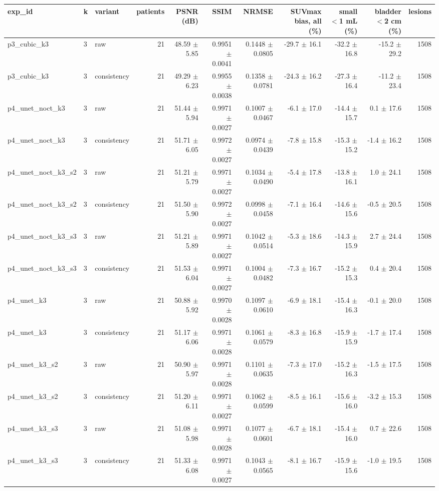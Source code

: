 \begin{tabular}{lllrrrrrrrr}
\toprule
exp\_id & k & variant & patients & PSNR (dB) & SSIM & NRMSE & SUVmax bias, all (\%) & small $<$1 mL (\%) & bladder $<$2 cm (\%) & lesions \\
\midrule
p3\_cubic\_k3 & 3 & raw & 21 & 48.59 $\pm$ 5.85 & 0.9951 $\pm$ 0.0041 & 0.1448 $\pm$ 0.0805 & -29.7 $\pm$ 16.1 & -32.2 $\pm$ 16.8 & -15.2 $\pm$ 29.2 & 1508 \\
p3\_cubic\_k3 & 3 & consistency & 21 & 49.29 $\pm$ 6.23 & 0.9955 $\pm$ 0.0038 & 0.1358 $\pm$ 0.0781 & -24.3 $\pm$ 16.2 & -27.3 $\pm$ 16.4 & -11.2 $\pm$ 23.4 & 1508 \\
p4\_unet\_noct\_k3 & 3 & raw & 21 & 51.44 $\pm$ 5.94 & 0.9971 $\pm$ 0.0027 & 0.1007 $\pm$ 0.0467 & -6.1 $\pm$ 17.0 & -14.4 $\pm$ 15.7 & 0.1 $\pm$ 17.6 & 1508 \\
p4\_unet\_noct\_k3 & 3 & consistency & 21 & 51.71 $\pm$ 6.05 & 0.9972 $\pm$ 0.0027 & 0.0974 $\pm$ 0.0439 & -7.8 $\pm$ 15.8 & -15.3 $\pm$ 15.2 & -1.4 $\pm$ 16.2 & 1508 \\
p4\_unet\_noct\_k3\_s2 & 3 & raw & 21 & 51.21 $\pm$ 5.79 & 0.9971 $\pm$ 0.0027 & 0.1034 $\pm$ 0.0490 & -5.4 $\pm$ 17.8 & -13.8 $\pm$ 16.1 & 1.0 $\pm$ 24.1 & 1508 \\
p4\_unet\_noct\_k3\_s2 & 3 & consistency & 21 & 51.50 $\pm$ 5.90 & 0.9972 $\pm$ 0.0027 & 0.0998 $\pm$ 0.0458 & -7.1 $\pm$ 16.4 & -14.6 $\pm$ 15.6 & -0.5 $\pm$ 20.5 & 1508 \\
p4\_unet\_noct\_k3\_s3 & 3 & raw & 21 & 51.21 $\pm$ 5.89 & 0.9971 $\pm$ 0.0027 & 0.1042 $\pm$ 0.0514 & -5.3 $\pm$ 18.6 & -14.3 $\pm$ 15.9 & 2.7 $\pm$ 24.4 & 1508 \\
p4\_unet\_noct\_k3\_s3 & 3 & consistency & 21 & 51.53 $\pm$ 6.04 & 0.9971 $\pm$ 0.0027 & 0.1004 $\pm$ 0.0482 & -7.3 $\pm$ 16.7 & -15.2 $\pm$ 15.3 & 0.4 $\pm$ 20.4 & 1508 \\
p4\_unet\_k3 & 3 & raw & 21 & 50.88 $\pm$ 5.92 & 0.9970 $\pm$ 0.0028 & 0.1097 $\pm$ 0.0610 & -6.9 $\pm$ 18.1 & -15.4 $\pm$ 16.3 & -0.1 $\pm$ 20.0 & 1508 \\
p4\_unet\_k3 & 3 & consistency & 21 & 51.17 $\pm$ 6.06 & 0.9971 $\pm$ 0.0028 & 0.1061 $\pm$ 0.0579 & -8.3 $\pm$ 16.8 & -15.9 $\pm$ 15.9 & -1.7 $\pm$ 17.4 & 1508 \\
p4\_unet\_k3\_s2 & 3 & raw & 21 & 50.90 $\pm$ 5.97 & 0.9971 $\pm$ 0.0028 & 0.1101 $\pm$ 0.0635 & -7.3 $\pm$ 17.0 & -15.2 $\pm$ 16.3 & -1.5 $\pm$ 17.5 & 1508 \\
p4\_unet\_k3\_s2 & 3 & consistency & 21 & 51.20 $\pm$ 6.11 & 0.9971 $\pm$ 0.0027 & 0.1062 $\pm$ 0.0599 & -8.5 $\pm$ 16.1 & -15.6 $\pm$ 16.0 & -3.2 $\pm$ 15.3 & 1508 \\
p4\_unet\_k3\_s3 & 3 & raw & 21 & 51.08 $\pm$ 5.98 & 0.9971 $\pm$ 0.0028 & 0.1077 $\pm$ 0.0601 & -6.7 $\pm$ 18.1 & -15.4 $\pm$ 16.0 & 0.7 $\pm$ 22.6 & 1508 \\
p4\_unet\_k3\_s3 & 3 & consistency & 21 & 51.33 $\pm$ 6.08 & 0.9971 $\pm$ 0.0027 & 0.1043 $\pm$ 0.0565 & -8.1 $\pm$ 16.7 & -15.9 $\pm$ 15.6 & -1.0 $\pm$ 19.5 & 1508 \\
\bottomrule
\end{tabular}
